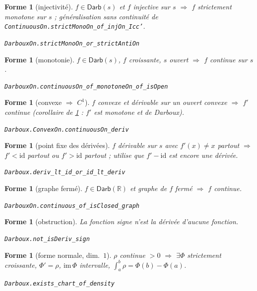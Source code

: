 \documentclass[11pt,a4paper]{article}
\theoremstyle{plain}
\newtheorem{forme}[theoreme]{Forme}
\theoremstyle{definition}
\theoremstyle{remark}
\newcommand{\Darb}{\mathsf{Darb}}
\newcommand{\R}{\mathbb{R}}
\begin{document}
\begin{forme}[injectivité]\label{f:inj}
$f\in\Darb(s)$ et $f$ injective sur $s$ $\Rightarrow$ $f$ strictement monotone sur $s$ ;
généralisation sans continuité de \texttt{ContinuousOn.strictMonoOn\_of\_injOn\_Icc'}.
\par\smallskip\hfill\small\texttt{DarbouxOn.strictMonoOn\_or\_strictAntiOn}
\end{forme}

\begin{forme}[monotonie]\label{f:mono}
$f\in\Darb(s)$, $f$ croissante, $s$ ouvert $\Rightarrow$ $f$ continue sur $s$.
\par\smallskip\hfill\small\texttt{DarbouxOn.continuousOn\_of\_monotoneOn\_of\_isOpen}
\end{forme}

\begin{forme}[convexe $\Rightarrow$ $C^1$]\label{f:cvx}
$f$ convexe et dérivable sur un ouvert convexe $\Rightarrow$ $f'$ continue (corollaire de
\ref{f:mono} : $f'$ est monotone \emph{et} de Darboux).
\par\smallskip\hfill\small\texttt{Darboux.ConvexOn.continuousOn\_deriv}
\end{forme}

\begin{forme}[point fixe des dérivées]\label{f:fix}
$f$ dérivable sur $s$ avec $f'(x)\neq x$ partout $\Rightarrow$ $f'<\mathrm{id}$ partout ou
$f'>\mathrm{id}$ partout ; utilise que $f'-\mathrm{id}$ est encore une dérivée.
\par\smallskip\hfill\small\texttt{Darboux.deriv\_lt\_id\_or\_id\_lt\_deriv}
\end{forme}

\begin{forme}[graphe fermé]\label{f:cg}
$f\in\Darb(\R)$ et graphe de $f$ fermé $\Rightarrow$ $f$ continue.
\par\smallskip\hfill\small\texttt{DarbouxOn.continuous\_of\_isClosed\_graph}
\end{forme}

\begin{forme}[obstruction]\label{f:sgn}
La fonction signe n'est la dérivée d'aucune fonction.
\par\smallskip\hfill\small\texttt{Darboux.not\_isDeriv\_sign}
\end{forme}

\begin{forme}[forme normale, dim.\ $1$]\label{f:norm}
$\rho$ continue $>0$ $\Rightarrow$ $\exists\Phi$ strictement croissante, $\Phi'=\rho$,
$\mathrm{im}\,\Phi$ intervalle, $\int_a^b\rho=\Phi(b)-\Phi(a)$.
\par\smallskip\hfill\small\texttt{Darboux.exists\_chart\_of\_density}
\end{forme}
\end{document}
